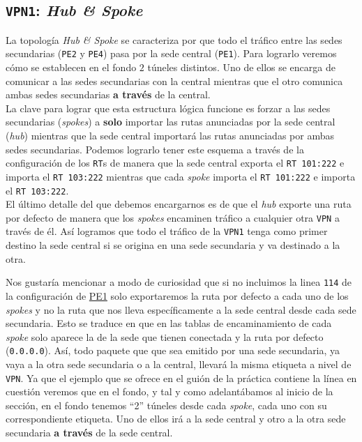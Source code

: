 \documentclass[11pt]{article}
\begin{document}
        \subsection{\texttt{VPN1}: \textit{Hub \& Spoke}}
            La topología \textit{Hub \& Spoke} se caracteriza por que todo el tráfico entre las sedes secundarias (\texttt{PE2} y \texttt{PE4}) pasa por la sede central (\texttt{PE1}). Para lograrlo veremos cómo se establecen en el fondo $2$ túneles distintos. Uno de ellos se encarga de comunicar a las sedes secundarias con la central mientras que el otro comunica ambas sedes secundarias \textbf{a través} de la central.\\

            La clave para lograr que esta estructura lógica funcione es forzar a las sedes secundarias (\textit{spokes}) a \textbf{solo} importar las rutas anunciadas por la sede central (\textit{hub}) mientras que la sede central importará las rutas anunciadas por ambas sedes secundarias. Podemos lograrlo tener este esquema a través de la configuración de los \texttt{RT}s de manera que la sede central exporta el \texttt{RT 101:222} e importa el \texttt{RT 103:222} mientras que cada \textit{spoke} importa el \texttt{RT 101:222} e importa el \texttt{RT 103:222}.\\

            El último detalle del que debemos encargarnos es de que el \textit{hub} exporte una ruta por defecto de manera que los \textit{spokes} encaminen tráfico a cualquier otra \texttt{VPN} a través de él. Así logramos que todo el tráfico de la \texttt{VPN1} tenga como primer destino la sede central si se origina en una sede secundaria y va destinado a la otra.

            Nos gustaría mencionar a modo de curiosidad que si no incluimos la linea \texttt{114} de la configuración de \href{https://github.com/UAH-s-Telematics-Engineering-Tasks/traff_eng/blob/master/P5/Router_confs/Hub_spoke_star/PE_1.cfg}{PE1} solo exportaremos la ruta por defecto a cada uno de los \textit{spokes} y no la ruta que nos lleva específicamente a la sede central desde cada sede secundaria. Esto se traduce en que en las tablas de encaminamiento de cada \textit{spoke} solo aparece la de la sede que tienen conectada y la ruta por defecto (\texttt{0.0.0.0}). Así, todo paquete que que sea emitido por una sede secundaria, ya vaya a la otra sede secundaria o a la central, llevará la misma etiqueta a nivel de \texttt{VPN}. Ya que el ejemplo que se ofrece en el guión de la práctica contiene la línea en cuestión veremos que en el fondo, y tal y como adelantábamos al inicio de la sección, en el fondo tenemos ``2'' túneles desde cada \textit{spoke}, cada uno con su correspondiente etiqueta. Uno de ellos irá a la sede central y otro a la otra sede secundaria \textbf{a través} de la sede central.\\
\end{document}
